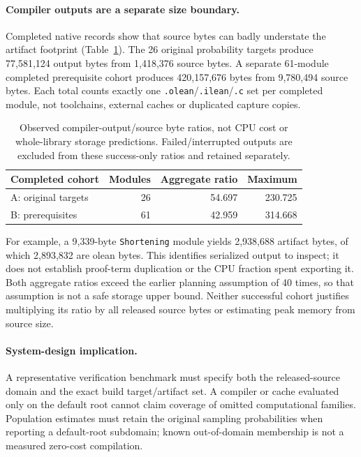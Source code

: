\documentclass[10pt,twocolumn]{article}
\begin{document}
\paragraph{Compiler outputs are a separate size boundary.}
Completed native records show that source bytes can badly understate the
artifact footprint (Table~\ref{tab:artifact-growth}).
The 26 original probability targets produce 77,581,124 output bytes from
1,418,376 source bytes. A separate 61-module completed prerequisite cohort
produces 420,157,676 bytes from 9,780,494 source bytes.
Each total counts exactly one \texttt{.olean}/\texttt{.ilean}/\texttt{.c}
set per completed module, not toolchains, external caches or duplicated
capture copies.

\begin{table}[t]
\centering\small
\setlength{\tabcolsep}{4pt}
\begin{tabular}{@{}lrrr@{}}
\toprule
Completed cohort & Modules & Aggregate ratio & Maximum\\
\midrule
A: original targets &26&54.697&230.725\\
B: prerequisites &61&42.959&314.668\\
\bottomrule
\end{tabular}
\caption{Observed compiler-output/source byte ratios, not CPU cost or
whole-library storage predictions. Failed/interrupted outputs are excluded
from these success-only ratios and retained separately.}
\label{tab:artifact-growth}
\end{table}

For example, a 9,339-byte \texttt{Shortening} module yields 2,938,688
artifact bytes, of which 2,893,832 are olean bytes.
This identifies serialized output to inspect; it does not establish
proof-term duplication or the CPU fraction spent exporting it.
Both aggregate ratios exceed the earlier planning assumption of 40 times,
so that assumption is not a safe storage upper bound.
Neither successful cohort justifies multiplying its ratio by all released
source bytes or estimating peak memory from source size.

\paragraph{System-design implication.}
A representative verification benchmark must specify both the released-source
domain and the exact build target/artifact set.
A compiler or cache evaluated only on the default root cannot claim coverage
of omitted computational families. Population estimates must retain the
original sampling probabilities when reporting a default-root subdomain;
known out-of-domain membership is not a measured zero-cost compilation.
\end{document}

